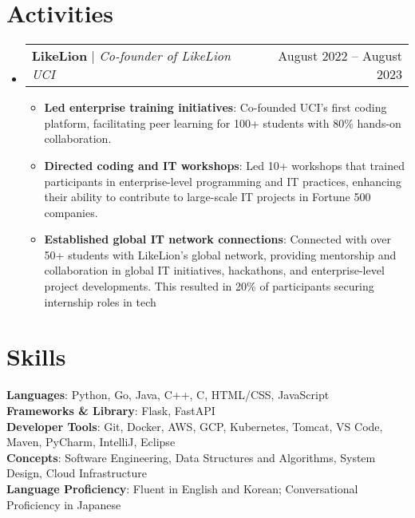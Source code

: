\documentclass[letterpaper,11pt]{article}
\makeatletter
\newcommand{\resumeItem}[1]{
  \item\small{
    {#1 \vspace{-2pt}}
  }
}
\newcommand{\resumeActivitiesHeading}[2]{
    \item
    \begin{tabular*}{0.97\textwidth}{l@{\extracolsep{\fill}}r}
      \small#1 & #2 \\
    \end{tabular*}\vspace{-7pt}
}
\newcommand{\resumeSubHeadingListStart}{\begin{itemize}[leftmargin=0.15in, label={}]}
\newcommand{\resumeSubHeadingListEnd}{\end{itemize}}
\newcommand{\resumeItemListStart}{\begin{itemize}}
\newcommand{\resumeItemListEnd}{\end{itemize}\vspace{-5pt}}
\makeatother
\begin{document}
%

\section{Activities}
    \resumeSubHeadingListStart
      \resumeActivitiesHeading
          {\textbf{LikeLion} $|$ \emph{Co-founder of LikeLion UCI}}{August 2022 -- August 2023}
          \resumeItemListStart
            \resumeItem{\textbf{Led enterprise training initiatives}: Co-founded UCI’s first coding platform, facilitating peer learning for 100+ students with 80\% hands-on collaboration.}
            \resumeItem{\textbf{Directed coding and IT workshops}: Led 10+ workshops that trained participants in enterprise-level programming and IT practices, enhancing their ability to contribute to large-scale IT projects in Fortune 500 companies.}
            \resumeItem{\textbf{Established global IT network connections}: Connected with over 50+ students with LikeLion's global network, providing mentorship and collaboration in global IT initiatives, hackathons, and enterprise-level project developments. This resulted in 20\% of participants securing internship roles in tech}
          \resumeItemListEnd
    \resumeSubHeadingListEnd

%

\section{Skills}
 \begin{itemize}[leftmargin=0.15in, label={}]
    \small{\item{
     \textbf{Languages}{: Python, Go, Java, C++, C, HTML/CSS, JavaScript} \\
     \textbf{Frameworks \& Library}{: Flask, FastAPI} \\
     \textbf{Developer Tools}{: Git, Docker, AWS, GCP, Kubernetes, Tomcat, VS Code, Maven, PyCharm, IntelliJ, Eclipse} \\
     \textbf{Concepts}{: Software Engineering, Data Structures and Algorithms, System Design, Cloud Infrastructure}\\
     \textbf{Language Proficiency}{: Fluent in English and Korean; Conversational Proficiency in Japanese}

    }}
 \end{itemize}


\end{document}
